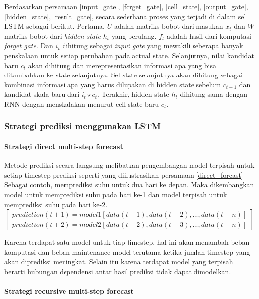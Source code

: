 \documentclass[../thesis.tex]{subfiles}
\begin{document}
Berdasarkan persamaan \ref{input_gate}, \ref{forget_gate}, \ref{cell_state}, \ref{output_gate}, \ref{hidden_state}, \ref{result_gate}, secara sederhana proses yang terjadi di dalam sel LSTM sebagai berikut. Pertama, $U$ adalah matriks bobot dari masukan $x_{t}$ dan $W$ matriks bobot dari \textit{hidden state} $h_{t}$ yang berulang. 
$f_{t}$ adalah hasil dari komputasi \textit{forget gate}. Dan $i_{t}$ dihitung sebagai \textit{input gate} yang mewakili seberapa banyak penskalaan untuk setiap perubahan pada actual state. 
Selanjutnya, nilai kandidat baru $c_t$ akan dihitung dan merepresentasikan informasi apa yang bisa ditambahkan ke state selanjutnya. 
Sel state selanjutnya akan dihitung sebagai kombinasi informasi apa yang harus dilupakan di hidden state sebelum $c_{t-1}$ dan kandidat skala baru dari $i_{t} \star c_{t}$. 
Terakhir, hidden state $h_{t}$ dihitung sama dengan RNN dengan menskalakan menurut cell state baru $c_t$.

\subsubsection{Strategi prediksi menggunakan LSTM}
\paragraph{Strategi direct multi-step forecast}

Metode prediksi secara langsung melibatkan pengembangan model terpisah untuk setiap timestep prediksi seperti yang diilustrasikan persamaan \ref{direct_forcast}
Sebagai contoh, memprediksi suhu untuk dua hari ke depan. Maka dikembangkan model untuk memprediksi suhu pada hari ke-1 dan model terpisah untuk memprediksi suhu pada hari ke-2.
\begin{equation} \label{direct_forcast}
\begin{bmatrix}
	prediction(t+1) = model1[data(t-1), data(t-2), ..., data(t-n)]
	\\prediction(t+2) = model2[data(t-2), data(t-3), ..., data(t-n)]
\end{bmatrix}
\end{equation}

Karena terdapat satu model untuk tiap timestep, hal ini akan menambah beban komputasi dan beban maintenance model terutama ketika jumlah timestep yang akan diprediksi meningkat. Selain itu
karena terdapat model yang terpisah berarti hubungan dependensi antar hasil prediksi tidak dapat dimodelkan.

\paragraph{Strategi recursive multi-step forecast} 
\end{document}
